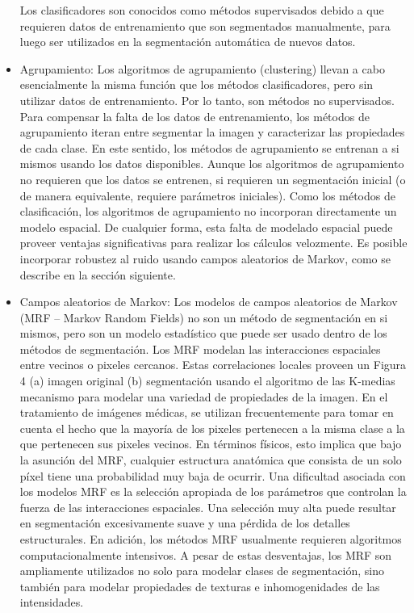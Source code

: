 \begin{itemize}
Los clasificadores son conocidos como m\'etodos supervisados debido a que requieren datos de entrenamiento que son segmentados manualmente, para luego ser utilizados en la segmentaci\'on autom\'atica de nuevos datos.
\item Agrupamiento: Los algoritmos de agrupamiento (clustering) llevan a cabo esencialmente la misma funci\'on que los m\'etodos clasificadores, pero sin utilizar datos de entrenamiento. Por lo tanto, son m\'etodos no supervisados. Para compensar la falta de los datos de entrenamiento, los m\'etodos de agrupamiento iteran entre segmentar la imagen y caracterizar las propiedades de cada clase. En este sentido, los m\'etodos de agrupamiento se entrenan a si mismos usando los datos disponibles. 
Aunque los algoritmos de agrupamiento no requieren que los datos se entrenen, si requieren un segmentaci\'on inicial (o de manera equivalente, requiere par\'ametros iniciales). Como los m\'etodos de clasificaci\'on, los algoritmos de agrupamiento no incorporan directamente un modelo espacial. De cualquier forma, esta falta de modelado espacial puede proveer ventajas significativas para realizar los c\'alculos velozmente. Es posible incorporar robustez al ruido usando campos aleatorios de Markov, como se describe en la sección siguiente.
\item Campos aleatorios de Markov: Los modelos de campos aleatorios de Markov (MRF – Markov Random Fields) no son un m\'etodo de segmentaci\'on en si mismos, pero son un modelo estad\'istico que puede ser usado dentro de los m\'etodos de segmentaci\'on. Los MRF modelan las interacciones espaciales entre vecinos o pixeles cercanos. Estas correlaciones locales proveen un Figura 4 (a) imagen original (b) segmentaci\'on usando el algoritmo de las K-medias mecanismo para modelar una variedad de propiedades de la imagen. En el tratamiento de im\'agenes m\'edicas, se utilizan frecuentemente para tomar en cuenta el hecho que la mayor\'ia de los pixeles pertenecen a la misma clase a la que pertenecen sus pixeles vecinos. En t\'erminos f\'isicos, esto implica que bajo la asunci\'on del MRF, cualquier estructura anat\'omica que consista de un solo p\'ixel tiene una probabilidad muy baja de ocurrir. Una dificultad asociada con los modelos MRF es la selección apropiada de los par\'ametros que controlan la fuerza de las interacciones espaciales. Una selecci\'on muy alta puede resultar en segmentaci\'on excesivamente suave y una p\'erdida de los detalles estructurales. En adici\'on, los m\'etodos MRF usualmente requieren algoritmos computacionalmente intensivos. A pesar de estas desventajas, los MRF son ampliamente utilizados no solo para modelar clases de segmentaci\'on, sino tambi\'en para modelar propiedades de texturas e inhomogenidades de las intensidades.

\end{itemize}
